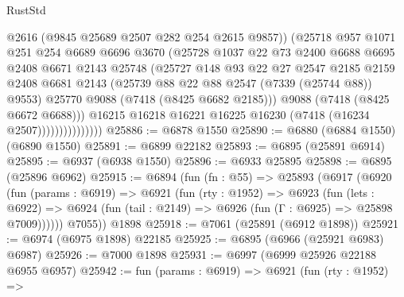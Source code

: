 \begin{lexlean}{RustStd}
\begin{coremodule}
                              @2616
                              (@9845 @25689 @2507 @282 @254 @2615 @9857))
                            (@25718
                              @957
                              @1071
                              @251
                              @254
                              @6689
                              @6696
                              @3670
                              (@25728
                                @1037
                                @22
                                @73
                                @2400
                                @6688
                                @6695
                                @2408
                                @6671
                                @2143
                                @25748
                                (@25727
                                  @148
                                  @93
                                  @22
                                  @27
                                  @2547
                                  @2185
                                  @2159
                                  @2408
                                  @6681
                                  @2143
                                  (@25739 @88 @22 @88 @2547 (@7339 (@25744 @88)) @9553)
                                  @25770
                                  @9088
                                  (@7418 (@8425 @6682 @2185)))
                                @9088
                                (@7418 (@8425 @6672 @6688)))
                              @16215
                              @16218
                              @16221
                              @16225
                              @16230
                              (@7418 (@16234 @2507)))))))))))))))
@25886 := @6878 @1550
@25890 := @6880 (@6884 @1550) (@6890 @1550)
@25891 := @6899 @22182
@25893 := @6895 (@25891 @6914)
@25895 := @6937 (@6938 @1550)
@25896 := @6933 @25895
@25898 := @6895 (@25896 @6962)
@25915 := @6894
    (fun (fn : @55) =>
    @25893
      (@6917
        (@6920
          (fun (params : @6919) =>
          @6921
            (fun (rty : @1952) =>
            @6923
              (fun (lets : @6922) =>
              @6924 (fun (tail : @2149) => @6926 (fun (Γ : @6925) => @25898 @7009))))))
        @7055))
    @1898
@25918 := @7061 (@25891 (@6912 @1898))
@25921 := @6974 (@6975 @1898) @22185
@25925 := @6895 (@6966 (@25921 @6983) @6987)
@25926 := @7000 @1898
@25931 := @6997 (@6999 @25926 @22188 @6955 @6957)
@25942 := fun (params : @6919) =>
  @6921
    (fun (rty : @1952) =>

\end{coremodule}
\end{lexlean}
